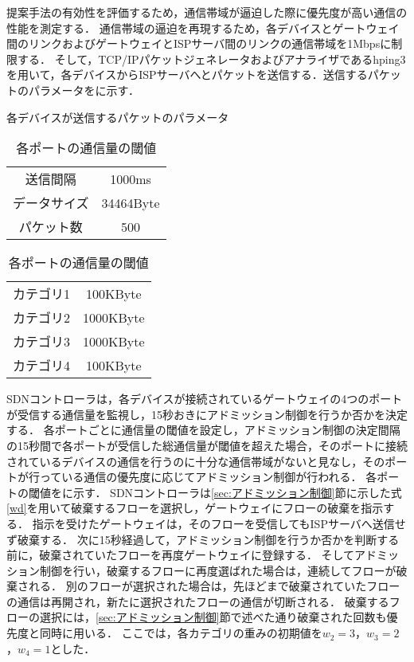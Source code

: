 \documentclass[a4paper,11pt,uplatex]{ujreport}
\begin{document}
  提案手法の有効性を評価するため，通信帯域が逼迫した際に優先度が高い通信の性能を測定する．
  通信帯域の逼迫を再現するため，各デバイスとゲートウェイ間のリンクおよびゲートウェイとISPサーバ間のリンクの通信帯域を1Mbpsに制限する．
  そして，TCP/IPパケットジェネレータおよびアナライザであるhping3を用いて，各デバイスからISPサーバへとパケットを送信する．送信するパケットのパラメータをに示す．

  \begin{table}[tb]
    \begin{minipage}[c]{0.5\hsize}
      \caption{各デバイスが送信するパケットのパラメータ}
      \label{tab:packetParameter}
      \centering
      \begin{tabular}{cc}
        \hline
        送信間隔 & 1000ms\\
        データサイズ & 34464Byte\\
        パケット数 & 500\\
        \hline
      \end{tabular}
    \end{minipage}
    \begin{minipage}[c]{0.5\hsize}
      \caption{各ポートの通信量の閾値}
      \label{tab:threshold}
      \centering
      \begin{tabular}{cc}
        \hline
        カテゴリ1 & 100KByte\\
        カテゴリ2 & 1000KByte\\
        カテゴリ3 & 1000KByte\\
        カテゴリ4 & 100KByte\\
        \hline
      \end{tabular}
    \end{minipage}
  \end{table}

  SDNコントローラは，各デバイスが接続されているゲートウェイの4つのポートが受信する通信量を監視し，15秒おきにアドミッション制御を行うか否かを決定する．
  各ポートごとに通信量の閾値を設定し，アドミッション制御の決定間隔の15秒間で各ポートが受信した総通信量が閾値を超えた場合，そのポートに接続されているデバイスの通信を行うのに十分な通信帯域がないと見なし，そのポートが行っている通信の優先度に応じてアドミッション制御が行われる．
  各ポートの閾値をに示す．
  SDNコントローラは\ref{sec:アドミッション制御}節に示した式\ref{wd}を用いて破棄するフローを選択し，ゲートウェイにフローの破棄を指示する．
  指示を受けたゲートウェイは，そのフローを受信してもISPサーバへ送信せず破棄する．
  次に15秒経過して，アドミッション制御を行うか否かを判断する前に，破棄されていたフローを再度ゲートウェイに登録する．
  そしてアドミッション制御を行い，破棄するフローに再度選ばれた場合は，連続してフローが破棄される．
  別のフローが選択された場合は，先ほどまで破棄されていたフローの通信は再開され，新たに選択されたフローの通信が切断される．
  破棄するフローの選択には，\ref{sec:アドミッション制御}節で述べた通り破棄された回数も優先度と同時に用いる．
  ここでは，各カテゴリの重みの初期値を$w_2=3$，$w_3=2$，$w_4=1$とした．\par
\end{document}
